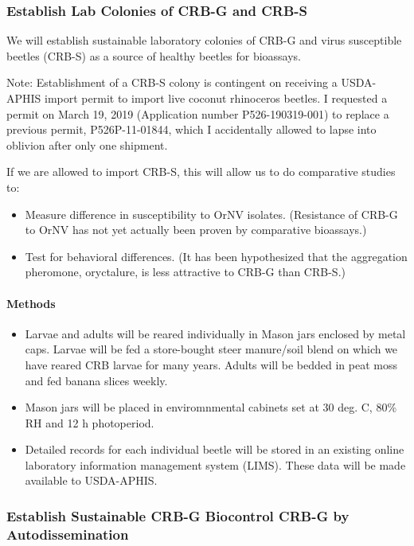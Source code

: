 \documentclass[14pt,english,letterpaper]{scrartcl}
\begin{document}
\subsubsection{Establish Lab Colonies of CRB-G and CRB-S}

We will establish sustainable laboratory colonies of CRB-G and virus susceptible beetles (CRB-S) as a source of healthy beetles for bioassays. 

Note: Establishment of a CRB-S colony is contingent on receiving a USDA-APHIS import permit to import live coconut rhinoceros beetles. I requested a permit on March 19, 2019 (Application number P526-190319-001) to replace a previous permit, P526P-11-01844, which I accidentally allowed to lapse into oblivion after only one shipment.

If we are allowed to import CRB-S, this will allow us to do comparative studies to:
\begin{itemize}
	\item Measure difference in susceptibility to OrNV isolates. (Resistance of CRB-G to OrNV has not yet actually been proven by comparative bioassays.)
	\item Test for behavioral differences. (It has been hypothesized that the aggregation pheromone, oryctalure, is less attractive to CRB-G than CRB-S.)
\end{itemize}

\paragraph{Methods}

\begin{itemize}
	\item Larvae and adults will be reared individually in Mason jars enclosed by metal caps. Larvae will be fed a store-bought steer manure/soil blend on which we have reared CRB larvae for many years. Adults will be bedded in peat moss and fed banana slices weekly. 
	\item Mason jars will be placed in enviromnmental cabinets set at 30 deg. C, 80\% RH and 12 h photoperiod. 
	\item Detailed records for each individual beetle will be stored in an existing online laboratory information management system (LIMS). These data will be made available to USDA-APHIS.
	
\end{itemize}


\subsubsection{Establish Sustainable CRB-G Biocontrol CRB-G by Autodissemination}
\end{document}
